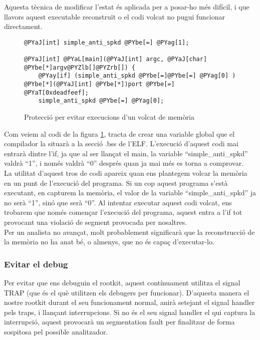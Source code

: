 Aquesta tècnica de modificar l'estat és aplicada per a posar-ho més difícil, i que llavors aquest 
executable reconstruït o el codi volcat no pugui funcionar directament. \\

\begin{figure}[h!]
\begin{Verbatim}[commandchars=@\[\]]
@PYaJ[int] simple_anti_spkd @PYbe[=] @PYag[1];

@PYaJ[int] @PYaL[main](@PYaJ[int] argc, @PYaJ[char] @PYbe[*]argv@PYZlb[]@PYZrb[]) {
    @PYay[if] (simple_anti_spkd @PYbe[=]@PYbe[=] @PYag[0] ) @PYbe[*](@PYaJ[int] @PYbe[*])port @PYbe[=] @PYaT[0xdeadfeef];
    simple_anti_spkd @PYbe[=] @PYag[0];
\end{Verbatim}
\caption{Protecció per evitar execucions d'un volcat de memòria}
\label{fig:antidebug_modificar_estat}
\end{figure}

Com veiem al codi de la figura \ref{fig:antidebug_modificar_estat}, tracta de crear una variable global que el compilador la situarà a la secció
.bss de l'ELF. L'execució d'aquest codi mai entrarà dintre l'if, ja que al ser llançat el main, la variable 
``simple\_anti\_spkd'' valdrà ``1'', i només valdrà ``0'' després quan ja mai més es torna a comprovar. \\

La utilitat d'aquest tros de codi apareix quan ens plantegem volcar la memòria en un punt de l'execució del 
programa. Si un cop aquest programa s'està executant, en capturem la memòria, el valor de la 
variable ``simple\_anti\_spkd'' ja no serà ``1'', sinó que serà ``0''. Al intentar executar aquest codi
volcat, ens trobarem que només començar l'execució del programa, aquest entra a l'if tot provocant una 
violació de segment provocada per nosaltres.  \\

Per un analista no avançat, molt probablement significarà que la reconstrucció de la memòria no ha anat bé,
o almenys, que no és capaç d'executar-lo.

\subsubsection{Evitar el debug}
Per evitar que ens debuguin el rootkit, aquest contínuament utilitza el signal TRAP (que és el 
què utilitzen els debugers per funcionar). D'aquesta manera el nostre rootkit durant el seu 
funcionament normal, anirà setejant el signal handler pels traps, i llançant interrupcions. Si no és el seu 
signal handler el qui captura la interrupció, aquest provocarà un segmentation fault per finalitzar
de forma sospitosa pel possible analitzador.

